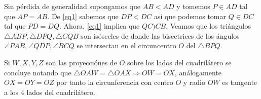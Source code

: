 Sin pérdida de generalidad supongamos que $AB < AD$ y tomemos $P\in AD$ tal que $AP = AB$. De \eqref{eq1} sabemos que $DP < DC$ así que podemos tomar $Q\in DC$ tal que $PD =DQ$. Ahora, \eqref{eq1} implica que $QC ) CB$. Veamos que los triángulos $\triangle  ABP, \triangle DPQ, \triangle CQB$ son isósceles de donde las bisectrices de los ángulos $\angle  PAB, \angle QDP, \angle BCQ$ se intersectan en el circuncentro $O$ del $\triangle BPQ$.

Si $W,X,Y,Z$ son las proyecciónes de $O$ sobre los lados del cuadrilátero se concluye notando que $\triangle OAW = \triangle OAX \Rightarrow OW = OX$, análogamente $OX = OY = OZ$ por tanto la circunferencia con centro $O$ y radio $OW$ es tangente a los 4 lados del cuadrilátero.